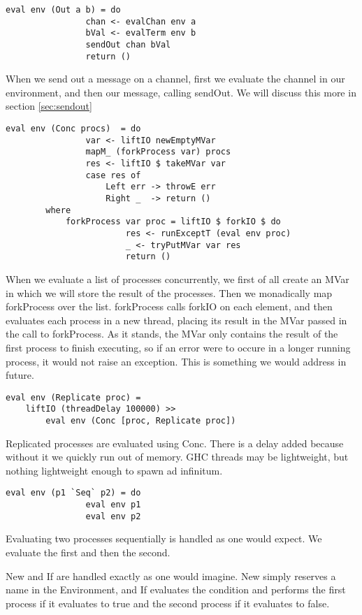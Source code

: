 \begin{verbatim}
eval env (Out a b) = do 
                chan <- evalChan env a
                bVal <- evalTerm env b
                sendOut chan bVal
                return ()
\end{verbatim}
When we send out a message on a channel, first we evaluate the channel in our environment, and then our message, calling sendOut. We will discuss this more in section \ref{sec:sendout}
\begin{verbatim}
eval env (Conc procs)  = do
                var <- liftIO newEmptyMVar 
                mapM_ (forkProcess var) procs
                res <- liftIO $ takeMVar var
                case res of
                    Left err -> throwE err
                    Right _  -> return ()
        where
            forkProcess var proc = liftIO $ forkIO $ do
                        res <- runExceptT (eval env proc)
                        _ <- tryPutMVar var res
                        return ()
\end{verbatim}
When we evaluate a list of processes concurrently, we first of all create an MVar in which we will store the result of the processes. Then we monadically map forkProcess over the list. forkProcess calls forkIO on each element, and then evaluates each process in a new thread, placing its result in the MVar passed in the call to forkProcess. As it stands, the MVar only contains the result of the first process to finish executing, so if an error were to occure in a longer running process, it
would not raise an exception. This is something we would address in future. 

\begin{verbatim}
eval env (Replicate proc) = 
    liftIO (threadDelay 100000) >> 
        eval env (Conc [proc, Replicate proc])
\end{verbatim}
Replicated processes are evaluated using Conc. There is a delay added because without it we quickly run out of memory. GHC threads may be lightweight, but nothing lightweight enough to spawn ad infinitum.

\begin{verbatim}
eval env (p1 `Seq` p2) = do
                eval env p1
                eval env p2
\end{verbatim}
Evaluating two processes sequentially is handled as one would expect. We evaluate the first and then the second.

New and If are handled exactly as one would imagine. New simply reserves a name in the Environment, and If evaluates the condition and performs the first process if it evaluates to true and the second process if it evaluates to false.


